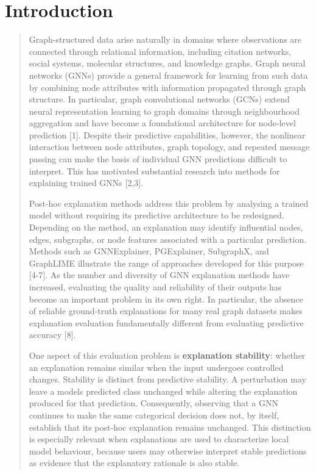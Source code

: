 \documentclass[a4paper]{article}
\begin{document}
\section{Introduction}\label{introduction}

\begin{quote}
Graph-structured data arise naturally in domains where observations are
connected through relational information, including citation networks,
social systems, molecular structures, and knowledge graphs. Graph neural
networks (GNNs) provide a general framework for learning from such data
by combining node attributes with information propagated through graph
structure. In particular, graph convolutional networks (GCNs) extend
neural representation learning to graph domains through neighbourhood
aggregation and have become a foundational architecture for node-level
prediction {[}1{]}. Despite their predictive capabilities, however, the
nonlinear interaction between node attributes, graph topology, and
repeated message passing can make the basis of individual GNN
predictions difficult to interpret. This has motivated substantial
research into methods for explaining trained GNNs {[}2,3{]}.

Post-hoc explanation methods address this problem by analysing a trained
model without requiring its predictive architecture to be redesigned.
Depending on the method, an explanation may identify influential nodes,
edges, subgraphs, or node features associated with a particular
prediction. Methods such as GNNExplainer, PGExplainer, SubgraphX, and
GraphLIME illustrate the range of approaches developed for this purpose
{[}4-7{]}. As the number and diversity of GNN explanation methods have
increased, evaluating the quality and reliability of their outputs has
become an important problem in its own right. In particular, the absence
of reliable ground-truth explanations for many real graph datasets makes
explanation evaluation fundamentally different from evaluating
predictive accuracy {[}8{]}.

One aspect of this evaluation problem is \textbf{explanation stability}:
whether an explanation remains similar when the input undergoes
controlled changes. Stability is distinct from predictive stability. A
perturbation may leave a model\textquotesingle s predicted class
unchanged while altering the explanation produced for that prediction.
Consequently, observing that a GNN continues to make the same
categorical decision does not, by itself, establish that its post-hoc
explanation remains unchanged. This distinction is especially relevant
when explanations are used to characterize local model behaviour,
because users may otherwise interpret stable predictions as evidence
that the explanatory rationale is also stable.


\end{quote}
\end{document}

